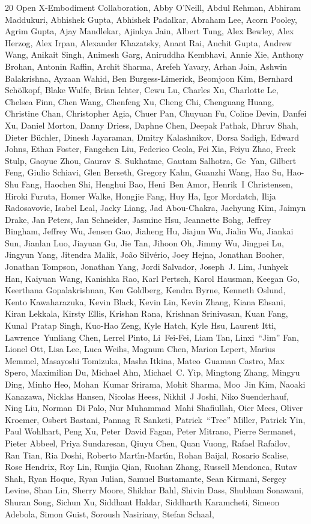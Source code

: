 \documentclass{article}
\begin{document}
\begin{thebibliography}{20}
Open X-Embodiment Collaboration, Abby O'Neill, Abdul Rehman, Abhiram Maddukuri, Abhishek Gupta, Abhishek Padalkar, Abraham Lee, Acorn Pooley, Agrim Gupta, Ajay Mandlekar, Ajinkya Jain, Albert Tung, Alex Bewley, Alex Herzog, Alex Irpan, Alexander Khazatsky, Anant Rai, Anchit Gupta, Andrew Wang, Anikait Singh, Animesh Garg, Aniruddha Kembhavi, Annie Xie, Anthony Brohan, Antonin Raffin, Archit Sharma, Arefeh Yavary, Arhan Jain, Ashwin Balakrishna, Ayzaan Wahid, Ben Burgess-Limerick, Beomjoon Kim, Bernhard Sch{\"o}lkopf, Blake Wulfe, Brian Ichter, Cewu Lu, Charles Xu, Charlotte Le, Chelsea Finn, Chen Wang, Chenfeng Xu, Cheng Chi, Chenguang Huang, Christine Chan, Christopher Agia, Chuer Pan, Chuyuan Fu, Coline Devin, Danfei Xu, Daniel Morton, Danny Driess, Daphne Chen, Deepak Pathak, Dhruv Shah, Dieter B{\"u}chler, Dinesh Jayaraman, Dmitry Kalashnikov, Dorsa Sadigh, Edward Johns, Ethan Foster, Fangchen Liu, Federico Ceola, Fei Xia, Feiyu Zhao, Freek Stulp, Gaoyue Zhou, Gaurav~S. Sukhatme, Gautam Salhotra, Ge~Yan, Gilbert Feng, Giulio Schiavi, Glen Berseth, Gregory Kahn, Guanzhi Wang, Hao Su, Hao-Shu Fang, Haochen Shi, Henghui Bao, Heni~Ben Amor, Henrik~I Christensen, Hiroki Furuta, Homer Walke, Hongjie Fang, Huy Ha, Igor Mordatch, Ilija Radosavovic, Isabel Leal, Jacky Liang, Jad Abou-Chakra, Jaehyung Kim, Jaimyn Drake, Jan Peters, Jan Schneider, Jasmine Hsu, Jeannette Bohg, Jeffrey Bingham, Jeffrey Wu, Jensen Gao, Jiaheng Hu, Jiajun Wu, Jialin Wu, Jiankai Sun, Jianlan Luo, Jiayuan Gu, Jie Tan, Jihoon Oh, Jimmy Wu, Jingpei Lu, Jingyun Yang, Jitendra Malik, Jo{\~a}o Silv{\'e}rio, Joey Hejna, Jonathan Booher, Jonathan Tompson, Jonathan Yang, Jordi Salvador, Joseph~J. Lim, Junhyek Han, Kaiyuan Wang, Kanishka Rao, Karl Pertsch, Karol Hausman, Keegan Go, Keerthana Gopalakrishnan, Ken Goldberg, Kendra Byrne, Kenneth Oslund, Kento Kawaharazuka, Kevin Black, Kevin Lin, Kevin Zhang, Kiana Ehsani, Kiran Lekkala, Kirsty Ellis, Krishan Rana, Krishnan Srinivasan, Kuan Fang, Kunal~Pratap Singh, Kuo-Hao Zeng, Kyle Hatch, Kyle Hsu, Laurent Itti, Lawrence~Yunliang Chen, Lerrel Pinto, Li~Fei-Fei, Liam Tan, Linxi~``Jim'' Fan, Lionel Ott, Lisa Lee, Luca Weihs, Magnum Chen, Marion Lepert, Marius Memmel, Masayoshi Tomizuka, Masha Itkina, Mateo~Guaman Castro, Max Spero, Maximilian Du, Michael Ahn, Michael~C. Yip, Mingtong Zhang, Mingyu Ding, Minho Heo, Mohan~Kumar Srirama, Mohit Sharma, Moo~Jin Kim, Naoaki Kanazawa, Nicklas Hansen, Nicolas Heess, Nikhil~J Joshi, Niko Suenderhauf, Ning Liu, Norman~Di Palo, Nur Muhammad~Mahi Shafiullah, Oier Mees, Oliver Kroemer, Osbert Bastani, Pannag~R Sanketi, Patrick~``Tree'' Miller, Patrick Yin, Paul Wohlhart, Peng Xu, Peter~David Fagan, Peter Mitrano, Pierre Sermanet, Pieter Abbeel, Priya Sundaresan, Qiuyu Chen, Quan Vuong, Rafael Rafailov, Ran Tian, Ria Doshi, Roberto Mart{\'\i}n-Mart{\'\i}n, Rohan Baijal, Rosario Scalise, Rose Hendrix, Roy Lin, Runjia Qian, Ruohan Zhang, Russell Mendonca, Rutav Shah, Ryan Hoque, Ryan Julian, Samuel Bustamante, Sean Kirmani, Sergey Levine, Shan Lin, Sherry Moore, Shikhar Bahl, Shivin Dass, Shubham Sonawani, Shuran Song, Sichun Xu, Siddhant Haldar, Siddharth Karamcheti, Simeon Adebola, Simon Guist, Soroush Nasiriany, Stefan Schaal, 
\end{thebibliography}
\end{document}
